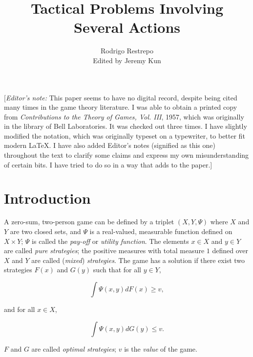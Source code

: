 \documentclass{article}
\title{Tactical Problems Involving Several Actions}
\author{Rodrigo Restrepo \\ Edited by Jeremy Kun}
\begin{document}
\maketitle


[\emph{Editor's note:} This paper seems to have no digital record, despite
being cited many times in the game theory literature. I was able to obtain a
printed copy from \emph{Contributions to the Theory of Games, Vol.  III}, 1957,
which was originally in the library of Bell Laboratories. It was checked out
three times. I have slightly modified the notation, which was originally
typeset on a typewriter, to better fit modern LaTeX. I have also added Editor's
notes (signified as this one) throughout the text to clarify some claims and
express my own misunderstanding of certain bits. I have tried to do so in a way
that adds to the paper.]

\section{Introduction}

A zero-sum, two-person game can be defined by a triplet $(X, Y, \Psi)$ where
$X$ and $Y$ are two closed sets, and $\Psi$ is a real-valued, measurable
function defined on $X \times Y$; $\Psi$ is called the \emph{pay-off} or
\emph{utility function}. The elements $x \in X$ and $y \in Y$ are called
\emph{pure strategies}; the positive measures with total measure $1$ defined
over $X$ and $Y$ are called (\emph{mixed}) \emph{strategies}. The game has a
solution if there exist two strategies $F(x)$ and $G(y)$ such that for all $y
\in Y$,

\[
    \int \Psi(x, y) dF(x) \geq v,
\]

and for all $x \in X$,

\[
    \int \Psi(x, y) dG(y) \leq v.
\]

$F$ and $G$ are called \emph{optimal strategies}; $v$ is the \emph{value} of
the game.
\end{document}
